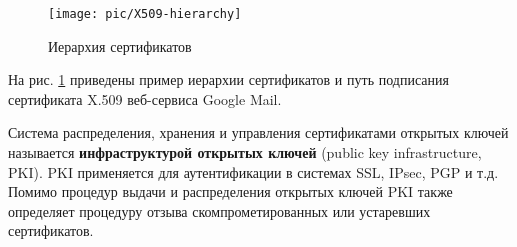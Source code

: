 \begin{figure}[h!]
	\centering
	\texttt{[image: pic/X509-hierarchy]}
	\caption{Иерархия сертификатов\label{fig:x509-hierarchy}}
\end{figure}

На рис. \ref{fig:x509-hierarchy} приведены пример иерархии сертификатов и путь подписания сертификата X.509 веб-сервиса Google Mail.

Система распределения, хранения и управления сертификатами открытых ключей называется \textbf{инфраструктурой открытых ключей} (public key infrastructure, PKI). PKI применяется для аутентификации в системах SSL, IPsec, PGP и т.д. Помимо процедур выдачи и распределения открытых ключей PKI также определяет процедуру отзыва скомпрометированных или устаревших сертификатов.
